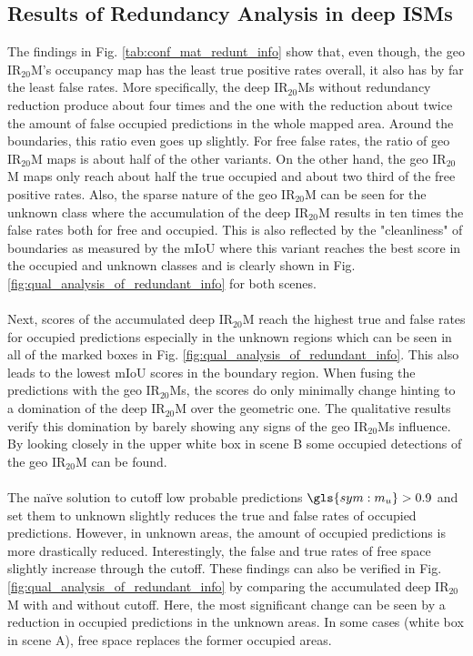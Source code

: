 \subsection{Results of Redundancy Analysis in deep ISMs}
\label{subsec:results_of_red_analy}
The findings in Fig. \ref{tab:conf_mat_redunt_info} show that, even though, the geo IR$_{20}$M's occupancy map has the least true positive rates overall, it also has by far the least false rates. More specifically, the deep IR$_{20}$Ms without redundancy reduction produce about four times and the one with the reduction about twice the amount of false occupied predictions in the whole mapped area. Around the boundaries, this ratio even goes up slightly. For free false rates, the ratio of geo IR$_{20}$M maps is about half of the other variants. On the other hand, the geo IR$_{20}$M maps only reach about half the true occupied and about two third of the free positive rates. Also, the sparse nature of the geo IR$_{20}$M can be seen for the unknown class where the accumulation of the deep IR$_{20}$M results in ten times the false rates both for free and occupied. This is also reflected by the "cleanliness" of boundaries as measured by the mIoU where this variant reaches the best score in the occupied and unknown classes and is clearly shown in Fig. \ref{fig:qual_analysis_of_redundant_info} for both scenes.
\\\\
Next, scores of the accumulated deep IR$_{20}$M reach the highest true and false rates for occupied predictions especially in the unknown regions which can be seen in all of the marked boxes in Fig. \ref{fig:qual_analysis_of_redundant_info}. This also leads to the lowest mIoU scores in the boundary region. When fusing the predictions with the geo IR$_{20}$Ms, the scores do only minimally change hinting to a domination of the deep IR$_{20}$M over the geometric one. The qualitative results verify this domination by barely showing any signs of the geo IR$_{20}$Ms influence. By looking closely in the upper white box in scene B some occupied detections of the geo IR$_{20}$M can be found.
\\\\
The na\"ive solution to cutoff low probable predictions $\gls{sym:m_u} > 0.9$ and set them to unknown slightly reduces the true and false rates of occupied predictions. However, in unknown areas, the amount of occupied predictions is more drastically reduced. Interestingly, the false and true rates of free space slightly increase through the cutoff. These findings can also be verified in Fig. \ref{fig:qual_analysis_of_redundant_info} by comparing the accumulated deep IR$_{20}$M with and without cutoff. Here, the most significant change can be seen by a reduction in occupied predictions in the unknown areas. In some cases (white box in scene A), free space replaces the former occupied areas.
